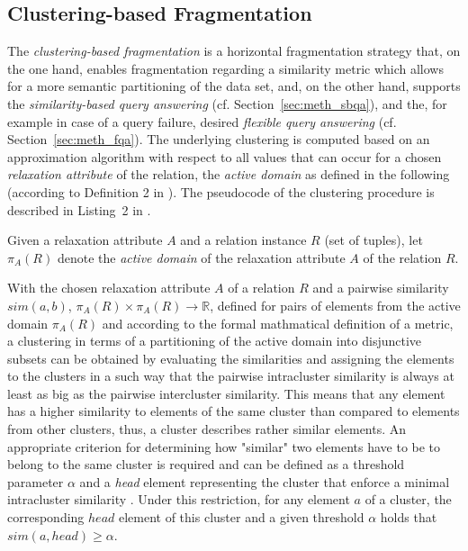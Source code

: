  
 
\subsection{Clustering-based Fragmentation}
\label{sec:meth_cbfr}

The \emph{clustering-based fragmentation} \citep{Wiese2014} is a horizontal fragmentation strategy that, on the one hand, enables fragmentation regarding 
a similarity metric which allows for a more semantic partitioning of the data set, and, on the other hand, supports the \emph{similarity-based query
answering} (cf. Section~\ref{sec:meth_sbqa}), and the, for example in case of a query failure, desired \emph{flexible query answering} 
(cf. Section~\ref{sec:meth_fqa}). The underlying clustering is computed based on an approximation algorithm \citep{Gonzales1985} with respect to all 
values that can occur for a chosen \emph{relaxation attribute} of the relation, the \emph{active domain} as defined in the following (according to
Definition 2 in \cite{Wiese2014}). The pseudocode of the clustering procedure is described in Listing~2 in \cite{Wiese2014}.

\begin{definition}
Given a relaxation attribute $A$ and a relation instance $R$ (set of tuples), let $\pi_A(R)$ denote the \emph{active domain} of the relaxation attribute
$A$ of the relation $R$.
\end{definition}

With the chosen relaxation attribute $A$ of a relation $R$ and a pairwise similarity $sim(a, b)$, $\pi_A(R) \times \pi_A(R) \to \mathbb{R}$, defined  
for pairs of elements from the active domain $\pi_A(R)$ and according to the formal mathmatical definition of a metric, a clustering in terms of a 
partitioning of the active domain into disjunctive subsets can be obtained by evaluating the similarities and assigning the elements to the clusters in
a such way that the pairwise intracluster similarity is always at least as big as the pairwise intercluster similarity. This means that any element has 
a higher similarity to elements of the same cluster than compared to elements from other clusters, thus, a cluster describes rather similar elements. 
An appropriate criterion for determining how "similar" two elements have to be to belong to the same cluster is required and can be defined as a threshold
parameter $\alpha$ and a \emph{head} element representing the cluster that enforce a minimal intracluster similarity \cite{Gonzales1985}. Under this
restriction, for any element $a$ of a cluster, the corresponding $head$ element of this cluster and a given threshold $\alpha$ holds that 
$sim(a,head) \geq \alpha$. 


